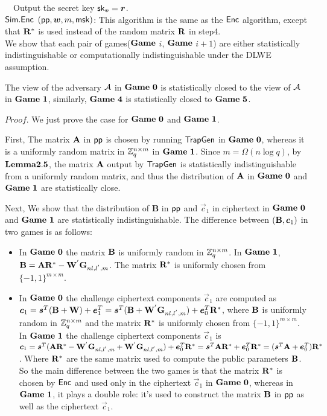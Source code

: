 ~~Output the secret key $\mathsf{sk}_{\boldsymbol{v}}=\boldsymbol{r}$.\\[0.4cm]
$\mathsf{Sim}.\mathsf{Enc}$ $(\mathsf{pp},\boldsymbol{w},m,\mathsf{msk})$: This algorithm is the same as the $\mathsf{Enc}$ algorithm, except that $\mathbf{R}^{*}$ is used instead of the random matrix $\mathbf{R}$ in step4.\\[0.6cm]
We show that each pair of games($\mathbf{Game}$ $i$, $\mathbf{Game}$ $i+1$) are either statistically indistinguishable or computationally indistinguishable under the DLWE assumption.
\begin{lemma}
The view of the adversary $\mathcal{A}$ in $\mat{Game\ 0}$ is statistically closed to the view of $\mathcal{A}$ in $\mathbf{Game\ 1}$, similarly, $\mathbf{Game\ 4}$ is statistically closed to $\mathbf{Game\ 5}$.
\end{lemma}
\noindent $Proof$. We just prove the case for $\mat{Game\ 0}$ and $\mathbf{Game\ 1}$.\

First, The matrix $\mathbf{A}$ in $\mathsf{pp}$ is chosen by running $\mathsf{TrapGen}$ in $\mat{Game\ 0}$, whereas it is a uniformly random matrix in $\mathbb{Z}^{n \times m}_{q}$ in $\mathbf{Game\ 1}$. Since $m=\Omega(n \log q)$, by $\mathbf{Lemma2.5}$, the matrix $\mathbf{A}$ output by $\mathsf{TrapGen}$  is statistically indistinguishable from a uniformly random matrix, and thus the distribution of $\mathbf{A}$ in $\mat{Game\ 0}$ and $\mathbf{Game\ 1}$ are statistically close.\

Next, We show that the distribution of \textbf{B} in $\mathsf{pp}$ and $\vec{c}_{1}$ in ciphertext in $\mat{Game\ 0}$ and $\mathbf{Game\ 1}$ are statistically indistinguishable. The difference between $(\mathbf{B},\boldsymbol{c}_{1})$ in two games is as follows:
\begin{itemize}
\item In $\mat{Game\ 0}$ the matrix $\mathbf{B}$ is uniformly random in $\mathbb{Z}^{n \times m}_{q}$. In $\mathbf{Game\ 1}$, $\mathbf{B}=\mathbf{A}\mathbf{R}^{*}-\mathbf{W}^{'}\mathbf{G}_{nl,l^{'},m}$. The matrix $\mathbf{R}^{*}$ is uniformly chosen from $\{-1,1\}^{m \times m}$.
\item In $\mat{Game\ 0}$ the challenge ciphertext components $\vec{c}_{1}$ are computed as $\boldsymbol{c}_{1}=\boldsymbol{s}^{T}(\mathbf{B}+\mathbf{W})+\boldsymbol{e}^{T}_{1}=\boldsymbol{s}^{T}(\mathbf{B}+\mathbf{W}^{'}\mathbf{G}_{nl,l^{'},m})+\boldsymbol{e}^{T}_{0}\mathbf{R}^{*}$, where $\mathbf{B}$ is uniformly random in $\mathbb{Z}^{n \times m}_{q}$ and the matrix $\mathbf{R}^{*}$ is uniformly chosen from $\{-1,1\}^{m \times m}$.\\
    In $\mathbf{Game\ 1}$ the challenge ciphertext components $\vec{c}_{1}$ is $\boldsymbol{c}_{1}=\boldsymbol{s}^{T}(\mathbf{A}\mathbf{R}^{*}-\mathbf{W}^{'}\mathbf{G}_{nl,l^{'},m}+\mathbf{W}^{'}\mathbf{G}_{nl,l^{'},m})+\boldsymbol{e}^{T}_{0}\mathbf{R}^{*}=\boldsymbol{s}^{T}\mathbf{A}\mathbf{R}^{*}+\boldsymbol{e}^{T}_{0}\mathbf{R}^{*}
    =(\boldsymbol{s}^{T}\mathbf{A}+\boldsymbol{e}^{T}_{0})\mathbf{R}^{*}$. Where $\mathbf{R}^{*}$ are the same matrix used to compute the public parameters $\mathbf{B}$. So the main difference between the two games is that the matrix $\mathbf{R}^{*}$ is chosen by $\mathsf{Enc}$ and used only in the ciphertext $\vec{c}_{1}$ in $\mat{Game\ 0}$, whereas in $\mathbf{Game\ 1}$, it plays a double role: it's used to construct the matrix $\mathbf{B}$ in $\mathsf{pp}$ as well as the ciphertext $\vec{c}_{1}$.
\end{itemize}

